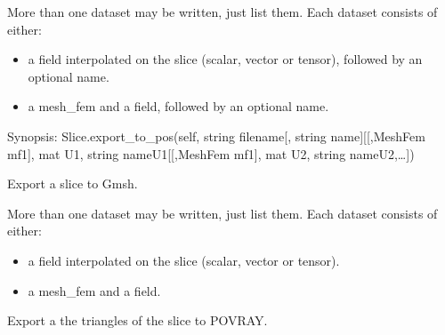 \documentclass[a4paper,11pt,english]{sphinxmanual}
\begin{document}
\begin{fulllineitems}
\begin{fulllineitems}
\begin{itemize}
\end{itemize}

More than one dataset may be written, just list them. Each dataset
consists of either:
\begin{itemize}
\item {} 
a field interpolated on the slice (scalar, vector or tensor),
followed by an optional name.

\item {} 
a mesh\_fem and a field, followed by an optional name.

\end{itemize}

\end{fulllineitems}


\begin{fulllineitems}
\label{\detokenize{python/cmdref_Slice:getfem.Slice.export_to_pos}}
Synopsis: Slice.export\_to\_pos(self, string filename{[}, string name{]}{[}{[},MeshFem mf1{]}, mat U1, string nameU1{[}{[},MeshFem mf1{]}, mat U2, string nameU2,…{]})

Export a slice to Gmsh.

More than one dataset may be written, just list them.
Each dataset consists of either:
\begin{itemize}
\item {} 
a field interpolated on the slice (scalar, vector or tensor).

\item {} 
a mesh\_fem and a field.

\end{itemize}

\end{fulllineitems}


\begin{fulllineitems}
\label{\detokenize{python/cmdref_Slice:getfem.Slice.export_to_pov}}
Export a the triangles of the slice to POV\sphinxhyphen{}RAY.


\end{fulllineitems}
\end{fulllineitems}
\end{document}
